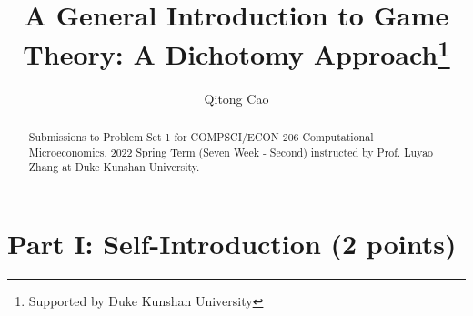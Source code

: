 \documentclass[runningheads]{llncs}
\begin{document}
%
\title{A General Introduction to Game Theory: A Dichotomy Approach\thanks{Supported by Duke Kunshan University}}
%
%
\author{Qitong Cao}
%
%
%

\maketitle              %
%
\begin{abstract}
Submissions to Problem Set 1 for COMPSCI/ECON 206 Computational Microeconomics, 2022 Spring Term (Seven Week - Second) instructed by Prof. Luyao Zhang at Duke Kunshan University. 


\end{abstract}
%
%
%
\section{Part I: Self-Introduction (2 points)}
\end{document}
